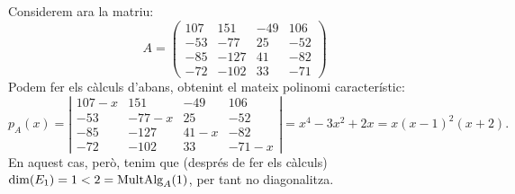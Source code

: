 \begin{exemple}
Considerem ara la matriu:
$$
A=\left(\begin{array}{rrrr}
107 & 151 & -49 & 106 \\
-53 & -77 & 25 & -52 \\
-85 & -127 & 41 & -82 \\
-72 & -102 & 33 & -71
\end{array}\right)
$$
Podem fer els càlculs d'abans, obtenint el mateix polinomi característic:
$$
p_A(x)=\left|\begin{array}{cccc}
107-x & 151 & -49 & 106 \\
-53 & -77-x & 25 & -52 \\
-85 & -127 & 41-x & -82 \\
-72 & -102 & 33 & -71-x
\end{array}\right|=x^4-3x^2+2x=x(x-1)^2(x+2).
$$
En aquest cas, però, tenim que (després de fer els càlculs) $\dim(E_1)=1<2=\operatorname{MultAlg}_A(1)$, per tant no diagonalitza.
\end{exemple}

